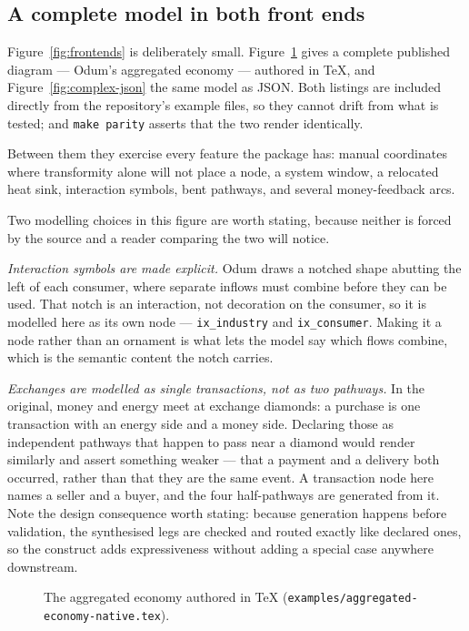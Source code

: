 \subsection{A complete model in both front ends}
\label{sec:complex}

Figure~\ref{fig:frontends} is deliberately small. Figure~\ref{fig:complex-tex}
gives a complete published diagram --- Odum's aggregated economy --- authored in
\TeX, and Figure~\ref{fig:complex-json} the same model as JSON. Both listings are
included directly from the repository's example files, so they cannot drift from
what is tested; and \texttt{make parity} asserts that the two render identically.

Between them they exercise every feature the package has: manual coordinates
where transformity alone will not place a node, a system window, a relocated
heat sink, interaction symbols, bent pathways, and several money-feedback arcs.

Two modelling choices in this figure are worth stating, because neither is
forced by the source and a reader comparing the two will notice.

\emph{Interaction symbols are made explicit.} Odum draws a notched shape abutting
the left of each consumer, where separate inflows must combine before they can
be used. That notch is an interaction, not decoration on the consumer, so it is
modelled here as its own node --- \texttt{ix\_industry} and
\texttt{ix\_consumer}. Making it a node rather than an ornament is what lets the
model say which flows combine, which is the semantic content the notch carries.

\emph{Exchanges are modelled as single transactions, not as two pathways.} In
the original, money and energy meet at exchange diamonds: a purchase is one
transaction with an energy side and a money side. Declaring those as independent
pathways that happen to pass near a diamond would render similarly and assert
something weaker --- that a payment and a delivery both occurred, rather than
that they are the same event. A transaction node here names a seller and a
buyer, and the four half-pathways are generated from it. Note the design
consequence worth stating: because generation happens before validation, the
synthesised legs are checked and routed exactly like declared ones, so the
construct adds expressiveness without adding a special case anywhere downstream.

\begin{figure}[htbp]

\caption{The aggregated economy authored in \TeX{}
(\texttt{examples/aggregated-economy-native.tex}).}
\label{fig:complex-tex}
\end{figure}

